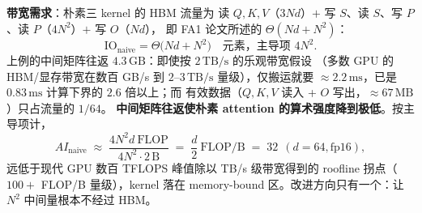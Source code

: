\textbf{带宽需求}：朴素三 kernel 的 HBM 流量为
读 $Q,K,V$（$3Nd$）$+$ 写 $S$、读 $S$、写 $P$、读 $P$（$4N^{2}$）$+$ 写 $O$（$Nd$），
即 FA1 论文所述的 $\Theta(Nd + N^{2})$：
\begin{equation}
  \mathrm{IO}_{\text{naive}} = \Theta\bigl(Nd + N^{2}\bigr)
  \quad\text{元素，主导项 } 4N^{2} .
  \label{eq:15-naive-io}
\end{equation}
上例的中间矩阵往返 $4.3\,\mathrm{GB}$：即使按 $2\,\mathrm{TB/s}$ 的乐观带宽假设
（多数 GPU 的 HBM/显存带宽在数百 GB/s 到 $2$--$3\,\mathrm{TB/s}$ 量级），仅搬运就要
$\approx 2.2\,\mathrm{ms}$，已是 $0.83\,\mathrm{ms}$ 计算下界的 $2.6$ 倍以上；而
有效数据（$Q,K,V$ 读入 + $O$ 写出，$\approx 67\,\mathrm{MB}$）只占流量的 $1/64$。
\textbf{中间矩阵往返使朴素 attention 的算术强度降到极低}。按主导项计，
\begin{equation}
  AI_{\text{naive}} \;\approx\; \frac{4N^{2}d\ \text{FLOP}}{4N^{2} \cdot 2\,\mathrm{B}}
  \;=\; \frac{d}{2}\ \text{FLOP/B} \;=\; 32\ \ (d{=}64, \text{fp16}) ,
  \label{eq:15-ai-naive}
\end{equation}
远低于现代 GPU 数百 TFLOPS 峰值除以 TB/s 级带宽得到的 roofline 拐点（$100{+}$
FLOP/B 量级），kernel 落在 memory-bound 区。改进方向只有一个：让 $N^{2}$
中间量根本不经过 HBM。

